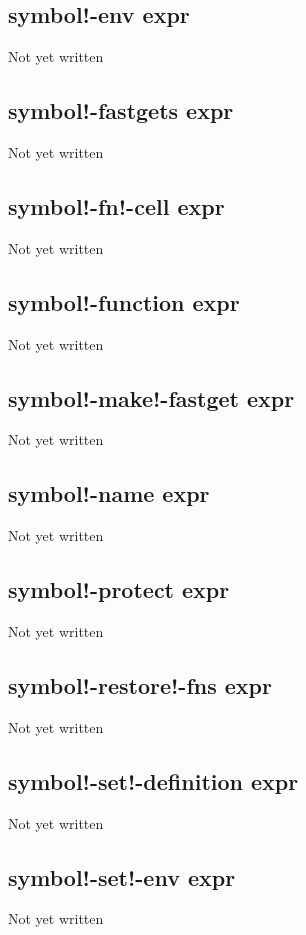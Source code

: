 \documentclass[a4paper,11pt]{article}
\begin{document}
{\subsection{\ttfamily symbol!-env expr}
Not yet written

\subsection{\ttfamily symbol!-fastgets expr}
Not yet written

\subsection{\ttfamily symbol!-fn!-cell expr}
Not yet written

\subsection{\ttfamily symbol!-function expr}
Not yet written

\subsection{\ttfamily symbol!-make!-fastget expr}
Not yet written

\subsection{\ttfamily symbol!-name expr}
Not yet written

\subsection{\ttfamily symbol!-protect expr}
Not yet written

\subsection{\ttfamily symbol!-restore!-fns expr}
Not yet written

\subsection{\ttfamily symbol!-set!-definition expr}
Not yet written

\subsection{\ttfamily symbol!-set!-env expr}
Not yet written

}
\end{document}

